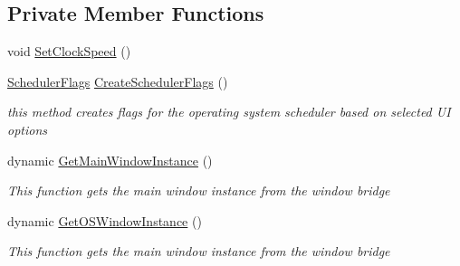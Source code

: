 \subsection*{Private Member Functions}
\begin{DoxyCompactItemize}
\item 
void \hyperlink{class_c_p_u___o_s___simulator_1_1_operating___system_1_1_o_s_core_a0697465a14d3f6111160c2c5a0d4082b}{Set\+Clock\+Speed} ()
\item 
\hyperlink{struct_c_p_u___o_s___simulator_1_1_operating___system_1_1_scheduler_flags}{Scheduler\+Flags} \hyperlink{class_c_p_u___o_s___simulator_1_1_operating___system_1_1_o_s_core_a0370de0efae69664c16b258846a64908}{Create\+Scheduler\+Flags} ()
\begin{DoxyCompactList}\small\item\em this method creates flags for the operating system scheduler based on selected U\+I options \end{DoxyCompactList}\item 
dynamic \hyperlink{class_c_p_u___o_s___simulator_1_1_operating___system_1_1_o_s_core_a6aa060134c64a17e248da359846f394b}{Get\+Main\+Window\+Instance} ()
\begin{DoxyCompactList}\small\item\em This function gets the main window instance from the window bridge \end{DoxyCompactList}\item 
dynamic \hyperlink{class_c_p_u___o_s___simulator_1_1_operating___system_1_1_o_s_core_a8943c071c2bb36810e560ef0e735f108}{Get\+O\+S\+Window\+Instance} ()
\begin{DoxyCompactList}\small\item\em This function gets the main window instance from the window bridge \end{DoxyCompactList}\end{DoxyCompactItemize}
